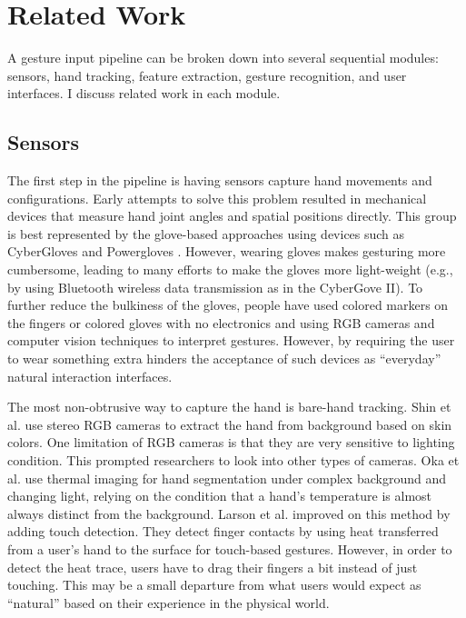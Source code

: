 \chapter{Related Work}\label{chap:related}
A gesture input
pipeline can be broken down into several sequential modules: sensors, hand
tracking, feature extraction, gesture recognition, and user interfaces.
I discuss related work in each module.

\section{Sensors}
The first step in the pipeline is having sensors capture hand movements
and configurations. Early attempts
to solve this problem resulted in mechanical devices that measure hand
joint angles and spatial positions directly. This group is best represented by
the glove-based approaches using devices such as CyberGloves \cite{fels09} and
Powergloves \cite{kadous02}. However, wearing gloves makes gesturing more
cumbersome, leading to many efforts to make the gloves more
light-weight (e.g., by using Bluetooth wireless data transmission as in the
CyberGove II). To further reduce the bulkiness of the gloves, people have used
colored markers on the fingers \cite{mistry09} or colored gloves with no
electronics \cite{Wang09} and using RGB cameras and computer vision techniques
to interpret gestures. However, by requiring the user to wear something extra hinders the acceptance of
such devices as ``everyday'' natural interaction interfaces. 

The most non-obtrusive way to capture the hand is bare-hand tracking. Shin et
al. \cite{shin04} use stereo RGB cameras to extract the hand from background
based on skin colors. One limitation of RGB cameras is that they are very
sensitive to lighting condition. This prompted researchers to look into other types of cameras. Oka et al. 
\cite{Oka02} use thermal imaging for hand segmentation under complex
background and changing light, relying on the condition that a hand's
temperature is almost always distinct from the background. 
Larson et al. \cite{larson11}
improved on this method by adding touch detection. They detect
finger contacts by using heat transferred from a user's hand to the
surface for touch-based gestures.
However, in order to detect the heat trace, users have to drag their fingers a
bit instead of just touching. This may be a small departure from what users
would expect as ``natural'' based on their experience in the physical world.

